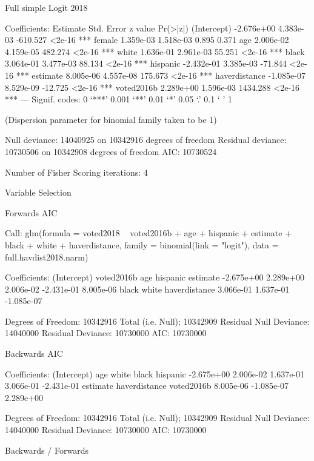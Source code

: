 Full simple Logit 2018

Coefficients:
                Estimate Std. Error  z value Pr(>|z|)
(Intercept)   -2.676e+00  4.383e-03 -610.527   <2e-16 ***
female         1.359e-03  1.518e-03    0.895    0.371
age            2.006e-02  4.159e-05  482.274   <2e-16 ***
white          1.636e-01  2.961e-03   55.251   <2e-16 ***
black          3.064e-01  3.477e-03   88.134   <2e-16 ***
hispanic      -2.432e-01  3.385e-03  -71.844   <2e-16 ***
estimate       8.005e-06  4.557e-08  175.673   <2e-16 ***
haverdistance -1.085e-07  8.529e-09  -12.725   <2e-16 ***
voted2016b     2.289e+00  1.596e-03 1434.288   <2e-16 ***
---
Signif. codes:  0 ‘***’ 0.001 ‘**’ 0.01 ‘*’ 0.05 ‘.’ 0.1 ‘ ’ 1

(Dispersion parameter for binomial family taken to be 1)

    Null deviance: 14040925  on 10342916  degrees of freedom
Residual deviance: 10730506  on 10342908  degrees of freedom
AIC: 10730524

Number of Fisher Scoring iterations: 4





Variable Selection

Forwards AIC

Call:  glm(formula = voted2018 ~ voted2016b + age + hispanic + estimate +
    black + white + haverdistance, family = binomial(link = "logit"),
    data = full.havdist2018.narm)

Coefficients:
  (Intercept)     voted2016b            age       hispanic       estimate
   -2.675e+00      2.289e+00      2.006e-02     -2.431e-01      8.005e-06
        black          white  haverdistance
    3.066e-01      1.637e-01     -1.085e-07

Degrees of Freedom: 10342916 Total (i.e. Null);  10342909 Residual
Null Deviance:	    14040000
Residual Deviance: 10730000 	AIC: 10730000



Backwards AIC

Coefficients:
  (Intercept)            age          white          black       hispanic
   -2.675e+00      2.006e-02      1.637e-01      3.066e-01     -2.431e-01
     estimate  haverdistance     voted2016b
    8.005e-06     -1.085e-07      2.289e+00

Degrees of Freedom: 10342916 Total (i.e. Null);  10342909 Residual
Null Deviance:	    14040000
Residual Deviance: 10730000 	AIC: 10730000


Backwards / Forwards

